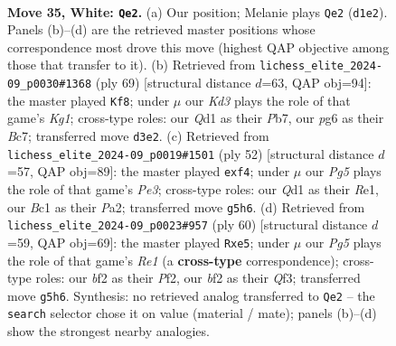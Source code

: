 \documentclass[11pt]{article}
\begin{document}
\clearpage

\begin{figure}[p]\centering
\begin{subfigure}{0.46\textwidth}\centering
\resizebox{\linewidth}{!}{%
\newchessgame
\chessboard[
  setfen={7r/r3k3/1pp1p1pp/6P1/Pp1P4/1P1KP3/R4bq1/2BQ4 w - - 0 35},
  showmover=false,
  pgfstyle=straightmove, color=movearrow, markmove={d1-e2}
]}
\caption{}
\end{subfigure}\hfill
\begin{subfigure}{0.46\textwidth}\centering
\resizebox{\linewidth}{!}{%
\newchessgame
\chessboard[
  setfen={4r1k1/1pb2pp1/2p2q2/p4P2/P2PB1Qp/2P5/1P4K1/4R3 b - - 0 35},
  showmover=false,
  pgfstyle=straightmove, color=movearrow, markmove={g8-f8}
]}
\caption{}
\end{subfigure}
\\[4pt]
\begin{subfigure}{0.46\textwidth}\centering
\resizebox{\linewidth}{!}{%
\newchessgame
\chessboard[
  setfen={3r2k1/p3qp2/2p5/1pP2p1p/1P3p2/2Q1P1P1/P6P/4R1K1 w - - 0 27},
  showmover=false,
  pgfstyle=straightmove, color=movearrow, markmove={e3-f4}
]}
\caption{}
\end{subfigure}\hfill
\begin{subfigure}{0.46\textwidth}\centering
\resizebox{\linewidth}{!}{%
\newchessgame
\chessboard[
  setfen={3r2k1/6p1/p1p4p/2p1r3/2P2pPq/1P1P1Q2/P4P2/4R1K1 w - - 0 31},
  showmover=false,
  pgfstyle=straightmove, color=movearrow, markmove={e1-e5}
]}
\caption{}
\end{subfigure}
\caption{\textbf{Move 35, White: \texttt{Qe2}.} (a) Our position; Melanie plays \texttt{Qe2} (\texttt{d1e2}). Panels (b)--(d) are the retrieved master positions whose correspondence most drove this move (highest QAP objective among those that transfer to it). (b) Retrieved from \texttt{lichess\_elite\_2024-09\_p0030\#1368} (ply 69) [structural distance $d$=63, QAP obj=94]: the master played \texttt{Kf8}; under $\mu$ our \emph{Kd3} plays the role of that game's \emph{Kg1}; cross-type roles: our \emph{Q}d1 as their \emph{P}b7, our \emph{p}g6 as their \emph{B}c7; transferred move \texttt{d3e2}. (c) Retrieved from \texttt{lichess\_elite\_2024-09\_p0019\#1501} (ply 52) [structural distance $d$=57, QAP obj=89]: the master played \texttt{exf4}; under $\mu$ our \emph{Pg5} plays the role of that game's \emph{Pe3}; cross-type roles: our \emph{Q}d1 as their \emph{R}e1, our \emph{B}c1 as their \emph{P}a2; transferred move \texttt{g5h6}. (d) Retrieved from \texttt{lichess\_elite\_2024-09\_p0023\#957} (ply 60) [structural distance $d$=59, QAP obj=69]: the master played \texttt{Rxe5}; under $\mu$ our \emph{Pg5} plays the role of that game's \emph{Re1} (a \textbf{cross-type} correspondence); cross-type roles: our \emph{b}f2 as their \emph{P}f2, our \emph{b}f2 as their \emph{Q}f3; transferred move \texttt{g5h6}. Synthesis: no retrieved analog transferred to \texttt{Qe2} -- the \texttt{search} selector chose it on value (material / mate); panels (b)--(d) show the strongest nearby analogies.}
\label{fig:thought-m68}
\end{figure}
\end{document}
